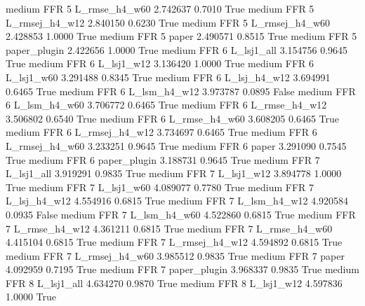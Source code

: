     medium      FFR                 5  L_rmse_h4_w60   2.742637      0.7010    True
    medium      FFR                 5 L_rmsej_h4_w12   2.840150      0.6230    True
    medium      FFR                 5 L_rmsej_h4_w60   2.428853      1.0000    True
    medium      FFR                 5          paper   2.490571      0.8515    True
    medium      FFR                 5   paper_plugin   2.422656      1.0000    True
    medium      FFR                 6     L_lsj1_all   3.154756      0.9645    True
    medium      FFR                 6     L_lsj1_w12   3.136420      1.0000    True
    medium      FFR                 6     L_lsj1_w60   3.291488      0.8345    True
    medium      FFR                 6   L_lsj_h4_w12   3.694991      0.6465    True
    medium      FFR                 6   L_lsm_h4_w12   3.973787      0.0895   False
    medium      FFR                 6   L_lsm_h4_w60   3.706772      0.6465    True
    medium      FFR                 6  L_rmse_h4_w12   3.506802      0.6540    True
    medium      FFR                 6  L_rmse_h4_w60   3.608205      0.6465    True
    medium      FFR                 6 L_rmsej_h4_w12   3.734697      0.6465    True
    medium      FFR                 6 L_rmsej_h4_w60   3.233251      0.9645    True
    medium      FFR                 6          paper   3.291090      0.7545    True
    medium      FFR                 6   paper_plugin   3.188731      0.9645    True
    medium      FFR                 7     L_lsj1_all   3.919291      0.9835    True
    medium      FFR                 7     L_lsj1_w12   3.894778      1.0000    True
    medium      FFR                 7     L_lsj1_w60   4.089077      0.7780    True
    medium      FFR                 7   L_lsj_h4_w12   4.554916      0.6815    True
    medium      FFR                 7   L_lsm_h4_w12   4.920584      0.0935   False
    medium      FFR                 7   L_lsm_h4_w60   4.522860      0.6815    True
    medium      FFR                 7  L_rmse_h4_w12   4.361211      0.6815    True
    medium      FFR                 7  L_rmse_h4_w60   4.415104      0.6815    True
    medium      FFR                 7 L_rmsej_h4_w12   4.594892      0.6815    True
    medium      FFR                 7 L_rmsej_h4_w60   3.985512      0.9835    True
    medium      FFR                 7          paper   4.092959      0.7195    True
    medium      FFR                 7   paper_plugin   3.968337      0.9835    True
    medium      FFR                 8     L_lsj1_all   4.634270      0.9870    True
    medium      FFR                 8     L_lsj1_w12   4.597836      1.0000    True
